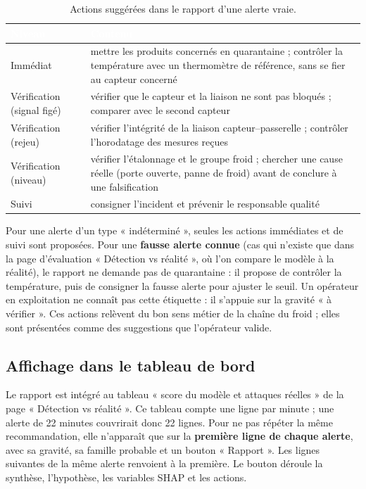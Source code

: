 \begin{table}[H]
\centering
\small
\renewcommand{\arraystretch}{1.35}
\caption{Actions suggérées dans le rapport d'une alerte vraie.}
\label{tab:expl_actions}
\begin{tabularx}{\textwidth}{@{}|>{\raggedright\arraybackslash}p{2.6cm}|>{\raggedright\arraybackslash}X|@{}}
\hline
\rowcolor{thead}
\textcolor{white}{\textbf{Niveau}} & \textcolor{white}{\textbf{Contenu}} \\
\hline
Immédiat & mettre les produits concernés en quarantaine ; contrôler la
température avec un thermomètre de référence, sans se fier au capteur concerné
\\
\hline
\rowcolor{trowa}
Vérification (signal figé) & vérifier que le capteur et la liaison ne sont pas
bloqués ; comparer avec le second capteur \\
\hline
Vérification (rejeu) & vérifier l'intégrité de la liaison
capteur--passerelle ; contrôler l'horodatage des mesures reçues \\
\hline
\rowcolor{trowa}
Vérification (niveau) & vérifier l'étalonnage et le groupe froid ; chercher
une cause réelle (porte ouverte, panne de froid) avant de conclure à une
falsification \\
\hline
Suivi & consigner l'incident et prévenir le responsable qualité \\
\hline
\end{tabularx}
\end{table}

Pour une alerte d'un type « indéterminé », seules les actions immédiates et de
suivi sont proposées. Pour une \textbf{fausse alerte connue} (cas qui n'existe
que dans la page d'évaluation « Détection vs réalité », où l'on compare le
modèle à la réalité), le rapport ne demande pas de quarantaine : il propose de
contrôler la température, puis de consigner la fausse alerte pour ajuster le
seuil. Un opérateur en exploitation ne connaît pas cette étiquette : il s'appuie
sur la gravité « à vérifier ». Ces actions relèvent du bon sens
métier de la chaîne du froid ; elles sont présentées comme des suggestions que
l'opérateur valide.

\subsection{Affichage dans le tableau de bord}

Le rapport est intégré au tableau « score du modèle et attaques réelles » de la
page « Détection vs réalité ». Ce tableau compte une ligne par minute ; une
alerte de 22 minutes couvrirait donc 22 lignes. Pour ne pas répéter la même
recommandation, elle n'apparaît que sur la \textbf{première ligne de chaque
alerte}, avec sa gravité, sa famille probable et un bouton « Rapport ». Les
lignes suivantes de la même alerte renvoient à la première. Le bouton déroule
la synthèse, l'hypothèse, les variables SHAP et les actions.

